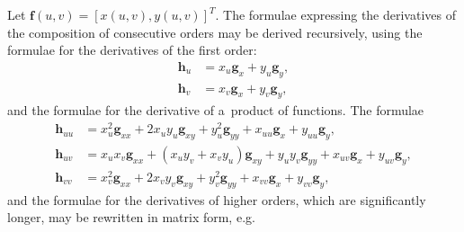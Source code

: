 Let $\bm{f}(u,v)=[x(u,v),y(u,v)]^T$.
The formulae expressing the derivatives of the composition of consecutive
orders may be derived recursively, using the formulae for the derivatives
of the first order:
\begin{align*}
  \bm{h}_u &{}= x_u\bm{g}_x + y_u\bm{g}_y, \\
  \bm{h}_v &{}= x_v\bm{g}_x + y_v\bm{g}_y,
\end{align*}
and the formulae for the derivative of a~product of functions. The
formulae
\begin{align*}
  \bm{h}_{uu} &{}= x_u^2\bm{g}_{xx} + 2x_uy_u\bm{g}_{xy} + y_u^2\bm{g}_{yy} +
              x_{uu}\bm{g}_x + y_{uu}\bm{g}_y, \\
  \bm{h}_{uv} &{}= x_ux_v\bm{g}_{xx} + (x_uy_v+x_vy_u)\bm{g}_{xy} + y_uy_v\bm{g}_{yy} +
              x_{uv}\bm{g}_x + y_{uv}\bm{g}_y, \\
  \bm{h}_{vv} &{}= x_v^2\bm{g}_{xx} + 2x_vy_v\bm{g}_{xy} + y_v^2\bm{g}_{yy} +
              x_{vv}\bm{g}_x + y_{vv}\bm{g}_y,
\end{align*}
and the formulae for the derivatives of higher orders, which are significantly
longer, may be rewritten in matrix form, e.g.
